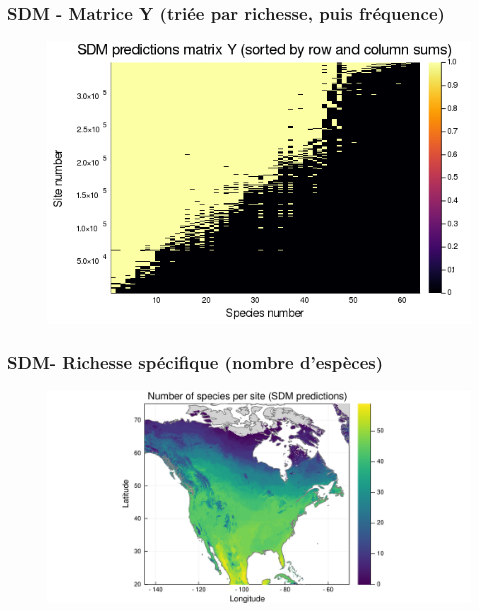 \documentclass[10pt]{beamer}
\begin{document}
\begin{frame}
  \frametitle{SDM - Matrice Y (triée par richesse, puis fréquence)}
  \begin{figure}
    \centering
    \includegraphics[scale=0.4]{fig/sdm-Y-rowcolsorted.png}
  \end{figure}
\end{frame}

\begin{frame}
  \frametitle{SDM- Richesse spécifique (nombre d'espèces)}
  \begin{figure}
    \centering
    \hspace*{-2cm}\includegraphics[scale=0.5]{fig/sdm-richness.pdf}
  \end{figure}
\end{frame}
\end{document}
